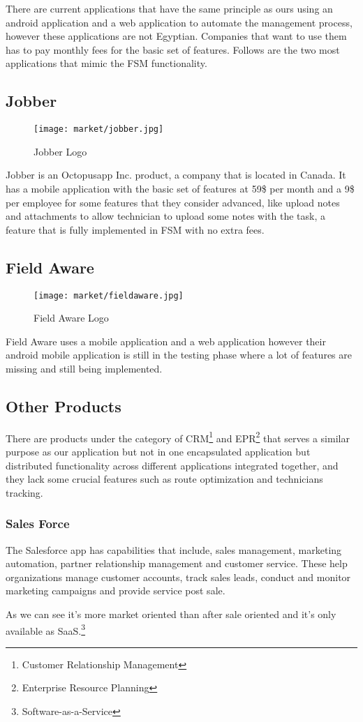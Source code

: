 There are current applications that have the same principle as ours using an android application and a web application to automate the management process, however these applications are not Egyptian. Companies that want to use them has to pay monthly fees for the basic set of features. Follows are the two most applications that mimic the FSM functionality.

\subsection{Jobber}
	\begin{figure}[ht]
		\centering
		\captionsetup{justification=centering}
		\texttt{[image: market/jobber.jpg]}
		\caption{Jobber Logo}
	\end{figure}
	Jobber is an Octopusapp Inc. product, a company that is located in Canada. It has a mobile application with the basic set of features at 59\$ per month and a 9\$ per employee for some features that they consider advanced, like upload notes and attachments to allow technician to upload some notes with the task, a feature that is fully implemented in FSM with no extra fees.
\subsection{Field Aware}
	\begin{figure}[ht]
		\centering
		\captionsetup{justification=centering}
		\texttt{[image: market/fieldaware.jpg]}
		\caption{Field Aware Logo}
	\end{figure}
	Field Aware uses a mobile application and a web application however their android mobile application is still in the testing phase where a lot of features are missing and still being implemented.

\subsection{Other Products}
	There are products under the category of CRM\footnote{Customer Relationship Management} and EPR\footnote{Enterprise Resource Planning} that serves a similar purpose as our application but not in one encapsulated application but distributed functionality across different applications integrated together, and they lack some crucial features such as route optimization and technicians tracking.
	\subsubsection{Sales Force}
		The Salesforce app has capabilities that include, sales management, marketing automation, partner relationship management and customer service. These help organizations manage customer accounts, track sales leads, conduct and monitor marketing campaigns and provide service post sale.
		
		As we can see it's more market oriented than after sale oriented and it's only available as SaaS.\footnote{Software-as-a-Service}